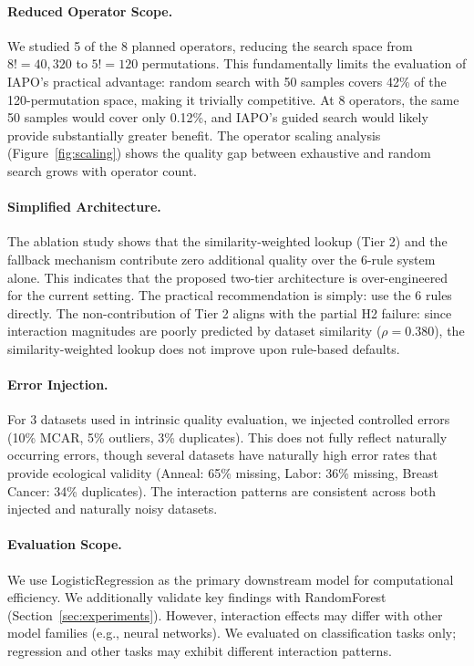 \documentclass[preprint]{article}
\begin{document}
\paragraph{Reduced Operator Scope.} We studied 5 of the 8 planned operators, reducing the search space from $8! = 40{,}320$ to $5! = 120$ permutations. This fundamentally limits the evaluation of IAPO's practical advantage: random search with 50 samples covers 42\% of the 120-permutation space, making it trivially competitive. At 8 operators, the same 50 samples would cover only 0.12\%, and IAPO's guided search would likely provide substantially greater benefit. The operator scaling analysis (Figure~\ref{fig:scaling}) shows the quality gap between exhaustive and random search grows with operator count.

\paragraph{Simplified Architecture.} The ablation study shows that the similarity-weighted lookup (Tier 2) and the fallback mechanism contribute zero additional quality over the 6-rule system alone. This indicates that the proposed two-tier architecture is over-engineered for the current setting. The practical recommendation is simply: use the 6 rules directly. The non-contribution of Tier 2 aligns with the partial H2 failure: since interaction magnitudes are poorly predicted by dataset similarity ($\rho = 0.380$), the similarity-weighted lookup does not improve upon rule-based defaults.

\paragraph{Error Injection.} For 3 datasets used in intrinsic quality evaluation, we injected controlled errors (10\% MCAR, 5\% outliers, 3\% duplicates). This does not fully reflect naturally occurring errors, though several datasets have naturally high error rates that provide ecological validity (Anneal: 65\% missing, Labor: 36\% missing, Breast Cancer: 34\% duplicates). The interaction patterns are consistent across both injected and naturally noisy datasets.

\paragraph{Evaluation Scope.} We use LogisticRegression as the primary downstream model for computational efficiency. We additionally validate key findings with RandomForest (Section~\ref{sec:experiments}). However, interaction effects may differ with other model families (e.g., neural networks). We evaluated on classification tasks only; regression and other tasks may exhibit different interaction patterns.
\end{document}

